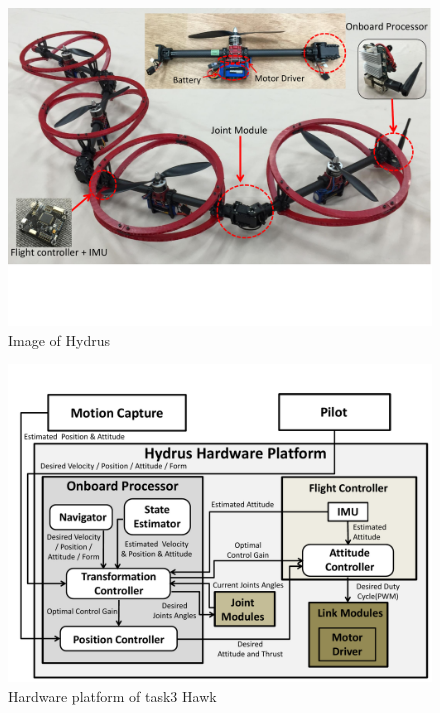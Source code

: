 \documentclass{standalone}
\begin{document}
\begin{figure}[h]
  \begin{center}
    \includegraphics[clip,  bb=0 105 720 535,  width=\columnwidth]{sections/task3/images/task3-hydrus.pdf}
    \caption{Image of Hydrus}
    \label{fig:task3-hydrus}
  \end{center}
\end{figure} 

\begin{figure}[h]
  \begin{center}
    \includegraphics[clip,  bb=0 0 720 540,  width=\columnwidth]{sections/task3/images/hydrus-platform.pdf}
    \caption{Hardware platform of task3 Hawk}
    \label{fig:task3-hydrus-platform}
  \end{center}
\end{figure} 
\end{document}
